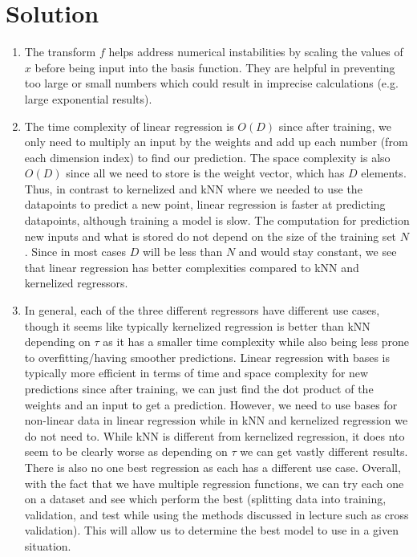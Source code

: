 \documentclass[submit]{../harvardml}
\newenvironment{solution}
  {\color{blue}\section*{Solution}}
{}
\begin{document}
\begin{solution}
\begin{enumerate}
        \item The transform $f$ helps address numerical instabilities by scaling the values of $x$ before being input into the basis function. They are helpful in preventing too large or small numbers which could result in imprecise calculations (e.g. large exponential results).

        \item The time complexity of linear regression is $O(D)$ since after training, we only need to multiply an input by the weights and add up each number (from each dimension index) to find our prediction. The space complexity is also $O(D)$ since all we need to store is the weight vector, which has $D$ elements. Thus, in contrast to kernelized and kNN where we needed to use the datapoints to predict a new point, linear regression is faster at predicting datapoints, although training a model is slow. The computation for prediction new inputs and what is stored do not depend on the size of the training set $N$. Since in most cases $D$ will be less than $N$ and would stay constant, we see that linear regression has better complexities compared to kNN and kernelized regressors.

        \item In general, each of the three different regressors have different use cases, though it seems like typically kernelized regression is better than kNN depending on $\tau$ as it has a smaller time complexity while also being less prone to overfitting/having smoother predictions. Linear regression with bases is typically more efficient in terms of time and space complexity for new predictions since after training, we can just find the dot product of the weights and an input to get a prediction. However, we need to use bases for non-linear data in linear regression while in kNN and kernelized regression we do not need to. While kNN is different from kernelized regression, it does nto seem to be clearly worse as depending on $\tau$ we can get vastly different results. There is also no one best regression as each has a different use case. Overall, with the fact that we have multiple regression functions, we can try each one on a dataset and see which perform the best (splitting data into training, validation, and test while using the methods discussed in lecture such as cross validation). This will allow us to determine the best model to use in a given situation.
    
    \end{enumerate}
\end{solution}
\end{document}
